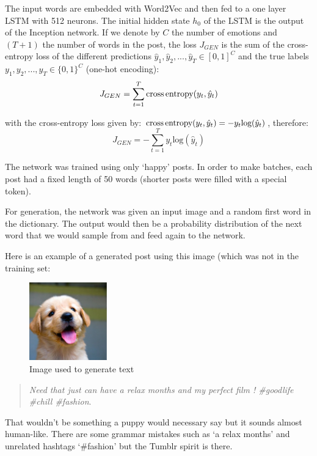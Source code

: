 The input words are embedded with Word2Vec and then fed to a one layer LSTM with 512 neurons. The initial hidden state $h_0$ of the LSTM is the output of the Inception network. If we denote by $C$ the number of emotions and $(T+1)$ the number of words in the post, the loss $J_{GEN}$ is the sum of the cross-entropy loss of the different predictions $\hat{y}_1, \hat{y}_2, ..., \hat{y}_T \in [0,1]^C$ and the true labels $y_1, y_2, ..., y_T \in \{0, 1\}^C$ (one-hot encoding):
\begin{equation}
    J_{GEN} = \sum_{t=1}^T \text{cross\,entropy}(y_t, \hat{y}_t)
\end{equation}

with the cross-entropy loss given by: $\text{cross\,entropy}(y_t, \hat{y}_t) = -y_t\text{log}(\hat{y}_t)$, therefore:
\begin{equation}
    J_{GEN} = -\sum_{t=1}^T y_t\text{log}(\hat{y}_t)
\end{equation}

The network was trained using only `happy' posts. In order to make batches, each post had a fixed length of 50 words (shorter posts were filled with a special token).

For generation, the network was given an input image and a random first word in the dictionary. The output would then be a probability distribution of the next word that we would sample from and feed again to the network.

Here is an example of a generated post using this image (which was not in the training set:
\begin{figure}[H]
    \centering
    \includegraphics[width=0.3\textwidth]{Images/puppy.jpg}
    \caption{Image used to generate text}
\end{figure}

\begin{quote}
    \textit{Need that just can have a relax months and my perfect film ! \#goodlife \#chill \#fashion}.
\end{quote}

That wouldn't be something a puppy would necessary say but it sounds almost human-like. There are some grammar mistakes such as `a relax months' and unrelated hashtags `\#fashion' but the Tumblr spirit is there.








